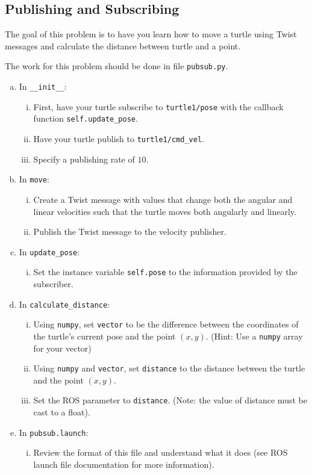 \subsection{Publishing and Subscribing}
\label{p:topics}

The goal of this problem is to have you learn how to move a turtle using Twist messages and
calculate the distance between turtle and a point.

The work for this problem should be done in file \texttt{pubsub.py}.

\begin{enumerate}[(a)]
  \item In \texttt{\_\_init\_\_}:
    \begin{enumerate}[i.]
      \item First, have your turtle subscribe to \texttt{turtle1/pose} with the callback function
        \texttt{self.update\_pose}. %
      \item Have your turtle publish to \texttt{turtle1/cmd\_vel}. %
      \item Specify a publishing rate of $10$.
    \end{enumerate}
  \item In \texttt{move}:
    \begin{enumerate}[i.]
      \item Create a Twist message with values that change both the angular and linear velocities
        such that the turtle moves both angularly and linearly.
      \item Publish the Twist message to the velocity publisher.
    \end{enumerate}
  \item In \texttt{update\_pose}:
    \begin{enumerate}[i.]
      \item Set the instance variable \texttt{self.pose} to the information provided by the subscriber.
    \end{enumerate}
  \item In \texttt{calculate\_distance}:
    \begin{enumerate}[i.]
      \item Using \texttt{numpy}, set \texttt{vector} to be the difference between the coordinates
        of the turtle's current pose and the point $(x,y)$. (Hint: Use a \texttt{numpy} array for
        your vector)
      \item Using \texttt{numpy} and \texttt{vector}, set \texttt{distance} to the distance between the
        turtle and the point $(x,y)$.
      \item Set the ROS parameter to \texttt{distance}. (Note: the value of distance must be cast
        to a float).
    \end{enumerate}
  \item In \texttt{pubsub.launch}:
    \begin{enumerate}[i.]
      \item Review the format of this file and understand what it does (see ROS launch file
        documentation for more information).
    \end{enumerate}
\end{enumerate}

